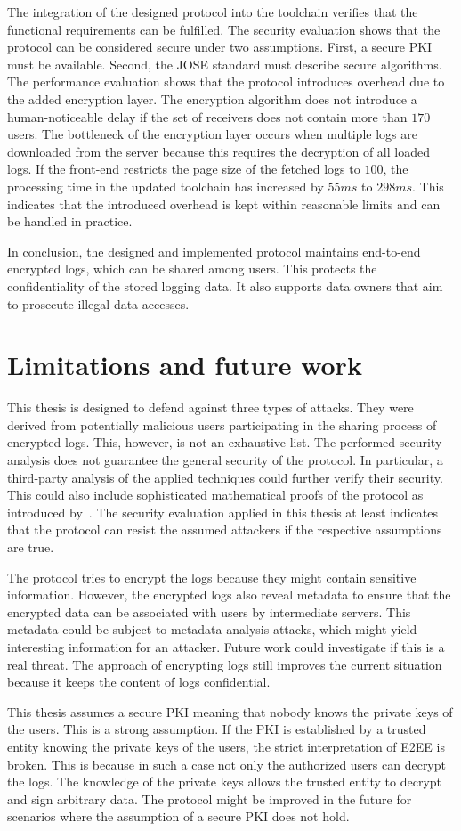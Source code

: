 \documentclass[../main.tex]{subfiles}
\begin{document}
The integration of the designed protocol into the toolchain verifies that the functional requirements can be fulfilled.
The security evaluation shows that the protocol can be considered secure under two assumptions.
First, a secure PKI must be available.
Second, the JOSE standard must describe secure algorithms.
The performance evaluation shows that the protocol introduces overhead due to the added encryption layer.
The encryption algorithm does not introduce a human-noticeable delay if the set of receivers does not contain more than $170$ users.
The bottleneck of the encryption layer occurs when multiple logs are downloaded from the server because this requires the decryption of all loaded logs.
If the front-end restricts the page size of the fetched logs to $100$, the processing time in the updated toolchain has increased by $55ms$ to $298ms$.
This indicates that the introduced overhead is kept within reasonable limits and can be handled in practice.

In conclusion, the designed and implemented protocol maintains end-to-end encrypted logs, which can be shared among users.
This protects the confidentiality of the stored logging data.
It also supports data owners that aim to prosecute illegal data accesses.

\section{Limitations and future work}
\label{sec:limitations}
This thesis is designed to defend against three types of attacks.
They were derived from potentially malicious users participating in the sharing process of encrypted logs.
This, however, is not an exhaustive list.
The performed security analysis does not guarantee the general security of the protocol.
In particular, a third-party analysis of the applied techniques could further verify their security.
This could also include sophisticated mathematical proofs of the protocol as introduced by~\cite{Katz2020}.   
The security evaluation applied in this thesis at least indicates that the protocol can resist the assumed attackers if the respective assumptions are true.

The protocol tries to encrypt the logs because they might contain sensitive information.
However, the encrypted logs also reveal metadata to ensure that the encrypted data can be associated with users by intermediate servers.
This metadata could be subject to metadata analysis attacks, which might yield interesting information for an attacker.
Future work could investigate if this is a real threat.
The approach of encrypting logs still improves the current situation because it keeps the content of logs confidential.

This thesis assumes a secure PKI meaning that nobody knows the private keys of the users.
This is a strong assumption.
If the PKI is established by a trusted entity knowing the private keys of the users, the strict interpretation of E2EE is broken.
This is because in such a case not only the authorized users can decrypt the logs.
The knowledge of the private keys allows the trusted entity to decrypt and sign arbitrary data.
The protocol might be improved in the future for scenarios where the assumption of a secure PKI does not hold.
\end{document}
